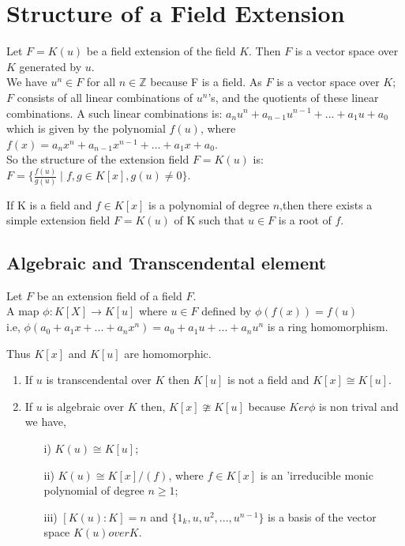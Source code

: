 \section{Structure of a Field Extension}
Let \(F=K(u)\) be a field extension of the field \(K\). Then \(F\) is a vector space over \(K\) generated by \(u\).\\
We have \(u^n \in F\) for all \(n \in \mathbb{Z}\) because F is a field. As \(F\) is a vector space over \(K\); \(F\) consists of all linear combinations of \(u^n \)'s, and the quotients of these linear combinations. A such linear combinations is: \(a_nu^n+a_{n-1}u^{n-1}+...+a_1u+a_0\) which is  given by the polynomial \(f(u)\), where \(f(x)=a_nx^n+a_{n-1}x^{n-1}+...+a_1x+a_0\).\\

So the structure of the extension field \(F=K(u)\) is:\\
\(F= \{\frac{f(u)}{g(u)} \;| \; f,g \in K[x],g(u) \neq 0\}\).\\

\begin{theorem}
If K is a field and \(f \in K[x]\) is a polynomial of degree \(n\),then there exists a simple extension field \(F=K(u)\) of K such that \(u\in F\) is a root of \(f\).
\end{theorem}

\subsection{Algebraic and Transcendental element}
\begin{theorem}
Let \(F\) be an extension field of a field \(F\).\\
A map \(\phi:K[X] \rightarrow K[u]\) where \(u \in F\) defined by \(\phi (f(x))=f(u)\)\\
i.e, \(\phi (a_0+a_1x+...+a_nx^n)= a_0+a_1u+...+a_nu^n\) is a ring homomorphism.
\end{theorem}

Thus \( K[x]\) and \(K[u]\) are homomorphic.
  \begin{enumerate}
  \item If \(u\) is transcendental over \(K\) then \(K[u]\) is not a field and \(K[x] \cong K[u]\).
  \item If \(u\) is algebraic over \(K\) then, \(K[x] \ncong K[u]\) because \(Ker\phi\) is non trival and we have,
    \begin{enumerate}
    \item[i)] \(K(u) \cong K[u]\);
    \item[ii)] \(K(u) \cong K[x]/(f)\), where \(f \in K[x]\) is an 'irreducible monic polynomial of degree \(n \geq 1\);
    \item[iii)] \([K(u):K]=n\) and \(\{1_k,u,u^2,...,u^{n-1}\}\) is a basis of the vector space \(K(u) over K\).
    \end{enumerate}
  \end{enumerate}

